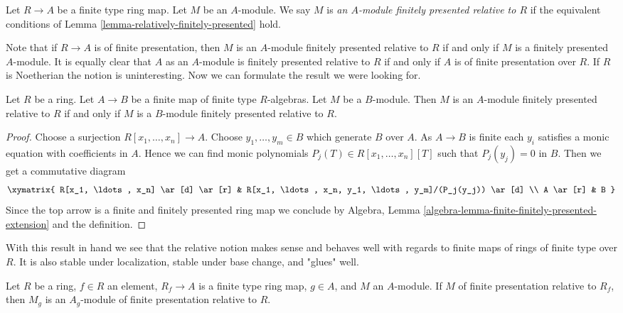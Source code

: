 \begin{definition}
\label{definition-relatively-finitely-presented}
Let $R \to A$ be a finite type ring map. Let $M$ be an $A$-module.
We say $M$ is {\it an $A$-module finitely presented relative to $R$}
if the equivalent conditions of
Lemma \ref{lemma-relatively-finitely-presented}
hold.
\end{definition}

\noindent
Note that if $R \to A$ is of finite presentation, then $M$ is an
$A$-module finitely presented relative to $R$ if and only if $M$
is a finitely presented $A$-module. It is equally clear that $A$ as
an $A$-module is finitely presented relative to $R$ if and only if
$A$ is of finite presentation over $R$. If $R$ is Noetherian the notion
is uninteresting. Now we can formulate the result we were looking for.

\begin{lemma}
\label{lemma-finite-extension}
Let $R$ be a ring. Let $A \to B$ be a finite map of finite type $R$-algebras.
Let $M$ be a $B$-module. Then
$M$ is an $A$-module finitely presented relative to $R$
if and only if
$M$ is a $B$-module finitely presented relative to $R$.
\end{lemma}

\begin{proof}
Choose a surjection $R[x_1, \ldots, x_n] \to A$.
Choose $y_1, \ldots, y_m \in B$ which generate $B$ over $A$.
As $A \to B$ is finite each $y_i$ satisfies a monic equation with
coefficients in $A$. Hence we can find monic polynomials
$P_j(T) \in R[x_1, \ldots, x_n][T]$ such that $P_j(y_j) = 0$ in $B$.
Then we get a commutative diagram
$$
\xymatrix{
R[x_1, \ldots, x_n] \ar[d] \ar[r] &
R[x_1, \ldots, x_n, y_1, \ldots, y_m]/(P_j(y_j)) \ar[d] \\
A \ar[r] & B
}
$$
Since the top arrow is a finite and finitely presented ring map
we conclude by
Algebra, Lemma \ref{algebra-lemma-finite-finitely-presented-extension}
and the definition.
\end{proof}

\noindent
With this result in hand we see that the relative notion makes sense
and behaves well with regards to finite maps of rings of finite type
over $R$. It is also stable under localization, stable under
base change, and "glues" well.

\begin{lemma}
\label{lemma-localize-relative-finite-presentation}
Let $R$ be a ring, $f \in R$ an element, $R_f \to A$ is a finite type ring map,
$g \in A$, and $M$ an $A$-module. If $M$ of finite presentation relative
to $R_f$, then $M_g$ is an $A_g$-module of finite presentation relative
to $R$.
\end{lemma}

